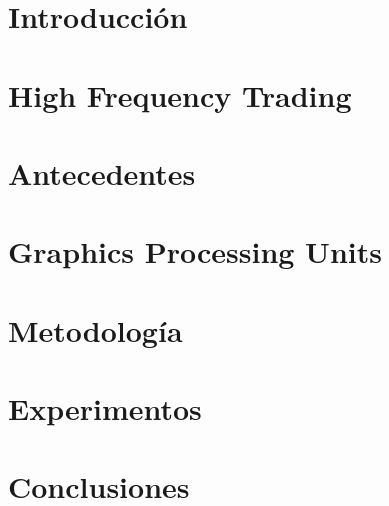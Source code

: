 \documentclass[spanish,12pt,letterpaper,oneside]{book}
\begin{document}
    

    \begin{spacing}{.97}
        \newpage
        


        \newpage
        
        

        \chapter{Introducción}
        \label{ch:introduction}
        

        \chapter{High Frequency Trading}
        \label{ch:hft}
        

        \chapter{Antecedentes}
        \label{ch:backgound}
        

        \chapter{Graphics Processing Units}
        \label{ch:gpu}
        
     
        \chapter{Metodología}
        \label{ch:implementacion}
        

        \chapter{Experimentos}
        \label{ch:experimentos}
        

        \chapter{Conclusiones}
        \label{ch:conclusiones}
        

        
        
        \nocite{*}
    \end{spacing}
\end{document}
